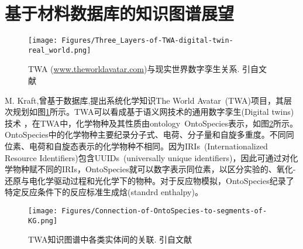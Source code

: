 \section{基于材料数据库的知识图谱展望} 
\begin{figure}[h!]
\centering
\texttt{[image: Figures/Three\_Layers-of-TWA-digital-twin-real\_world.png]}
\caption{\small\textrm{TWA (\url{www.theworldavatar.com})与现实世界数字孪生关系. 引自文献~\cite{ACR56-128_2023}}}%
\label{Fig:Three_Layers-of-TWA}
\end{figure}
\textrm{M. Kraft,}曾基于数据库,提出系统化学知识\textrm{The World Avatar~(TWA)}项目，其层次规划如图\ref{Fig:Three_Layers-of-TWA}所示。\textrm{TWA}可以看成基于语义网技术的通用数字孪生\textrm{(Digital twins)}技术%
，在\textrm{TWA}中，化学物种及其性质由\textrm{ontology~OntoSpecies}表示，如图\ref{Fig:OntoSpecies-to-segments-TWA}所示。\textrm{OntoSpecies}中的化学物种主要纪录分子式、电荷、分子量和自旋多重度。不同同位素、电荷和自旋态表示的化学物种不相同。因为\textrm{IRIs~(Internationalized Resource Identifiers)}包含\textrm{UUIDs~(universally unique identifiers)}，因此可通过对化学物种赋不同的\textrm{IRIs}，\textrm{OntoSpecies}就可以数字表示同位素，以区分实验的、氧化-还原与电化学驱动过程和光化学下的物种。对于反应物模拟，\textrm{OntoSpecies}纪录了特定反应条件下的反应标准生成焓\textrm{(standrd enthalpy)}。
\begin{figure}[h!]
\centering
\texttt{[image: Figures/Connection-of-OntoSpecies-to-segments-of-KG.png]}
\caption{\small\textrm{TWA知识图谱中各类实体间的关联. 引自文献~\cite{ACR56-128_2023}}}%
\label{Fig:OntoSpecies-to-segments-TWA}
\end{figure}

